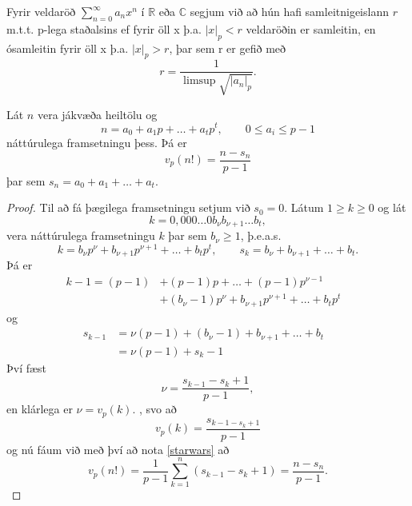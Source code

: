 Fyrir veldaröð $\sum_{n=0}^{\infty} a_nx^n$ í $\mathbb{R}$ eða $\mathbb{C}$ segjum við að hún hafi samleitnigeislann $r$ 
m.t.t. p-lega staðalsins ef fyrir öll x þ.a. $|x|_p < r$ veldaröðin er samleitin, en ósamleitin fyrir öll x þ.a. $|x|_p > r$, 
þar sem r er gefið með
\begin{equation*}
r = \frac{1}{\limsup \sqrt{|a_n|_p }}.
\end{equation*} 


\begin{hjalparsetn}
Lát $n$ vera jákvæða heiltölu og 
\begin{equation*}
n = a_0 + a_1p+ \ldots + a_tp^t, \qquad 0\leq a_i \leq p - 1
\end{equation*}
náttúrulega framsetningu þess. Þá er
\begin{equation*}
v_p(n!) = \frac{n - s_n}{p-1}
\end{equation*}
þar sem $s_n = a_0 + a_1 + \ldots + a_t$.
\end{hjalparsetn}
\begin{proof}
Til að fá þægilega framsetningu setjum við $s_0 = 0$. Látum $1 \geq k \geq 0$ og lát
\begin{equation*}
k = 0,0 0 0 \ldots 0 b_\nu b_{\nu + 1} \ldots b_t ,  
\end{equation*}
vera náttúrulega framsetningu $k$ þar sem $b_\nu \geq 1$, þ.e.a.s. 
\begin{equation*}
k = b_\nu p^\nu + b_{\nu +1} p^{\nu+1} + \ldots + b_t p^t, \qquad s_k = b_\nu + b_{\nu+1} + \ldots + b_t.
\end{equation*}
Þá er 
\begin{align*}
k-1 = (p-1) & + (p-1)p + \ldots + (p-1)p^{\nu -1} &\\
 & + (b_\nu -1)p^\nu + b_{\nu+1} p^{\nu +1} + \ldots + b_t p^t &
\end{align*}
og 
\begin{align*}
s_{k-1} &= \nu(p-1) + (b_\nu -1) + b_{\nu+1} + \ldots + b_t & \\
 &  = \nu(p-1) + s_k -1 &
\end{align*}
Því fæst
\begin{equation*}
\nu = \frac{s_{k-1} - s_k + 1}{p-1 },
\end{equation*}
en klárlega er $\nu = v_p (k).$ , svo að
\begin{equation*}
v_p (k) = \frac{s_{k-1 - s_k +1}}{p-1}
\end{equation*}
og nú fáum við með því að nota \ref{starwars} að 
\begin{equation*}
v_p(n!) = \frac{1}{p-1} \sum_{k=1}^n (s_{k-1} - s_k +1) = \frac{n - s_n}{p-1}.
\end{equation*}
\end{proof}

